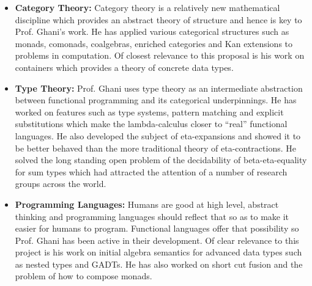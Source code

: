 \documentclass[a4paper,10pt]{article}
\begin{document}
\begin{itemize} \item {\bf Category Theory:} Category theory is a
  relatively new mathematical discipline which provides an abstract
  theory of structure and hence is key to Prof. Ghani's work. He has applied
  various categorical structures such as monads, comonads, coalgebras,
  enriched categories and Kan extensions to problems in computation.
  Of closest relevance to this proposal is his work on containers which
  provides a theory of concrete data types.

\item {\bf Type Theory:} Prof. Ghani uses type theory as an intermediate
abstraction between functional programming and its categorical
underpinnings. He has worked on features such as type systems, pattern
matching and explicit substitutions which make the lambda-calculus
closer to ``real'' functional languages. 
He also developed the subject of eta-expansions and showed it to be
better behaved than the more traditional theory of eta-contractions. He
solved the long standing open problem of the decidability of
beta-eta-equality for sum types which had attracted the attention of a
number of research groups across the world.

\item {\bf Programming Languages:} Humans are good at high level,
abstract thinking and programming languages should reflect that so as
to make it easier for humans to program. Functional languages offer
that possibility so Prof. Ghani has been active in their development.  
Of clear relevance to this project is his work on initial algebra
semantics for advanced data types such as nested types and GADTs. He has
also worked on short cut fusion and the problem of how to compose
monads.

\end{itemize}
\end{document}
